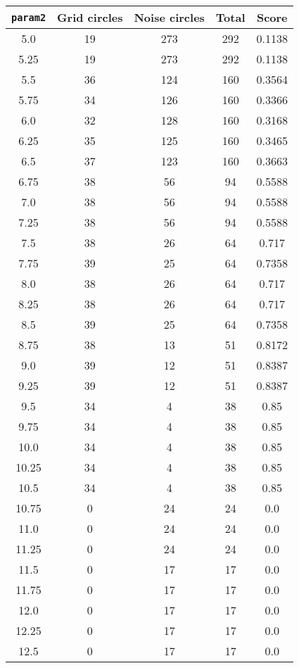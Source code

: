 \documentclass[letterpaper, 12pt]{article}
\begin{document}
\begin{longtable}{|c|c|c|c|c|}
\hline
\textbf{\texttt{param2}} & \textbf{Grid circles} & \textbf{Noise circles} & \textbf{Total} & \textbf{Score} \\
\hline
5.0 & 19 & 273 & 292 & 0.1138 \\
\hline
5.25 & 19 & 273 & 292 & 0.1138 \\
\hline
5.5 & 36 & 124 & 160 & 0.3564 \\
\hline
5.75 & 34 & 126 & 160 & 0.3366 \\
\hline
6.0 & 32 & 128 & 160 & 0.3168 \\
\hline
6.25 & 35 & 125 & 160 & 0.3465 \\
\hline
6.5 & 37 & 123 & 160 & 0.3663 \\
\hline
6.75 & 38 & 56 & 94 & 0.5588 \\
\hline
7.0 & 38 & 56 & 94 & 0.5588 \\
\hline
7.25 & 38 & 56 & 94 & 0.5588 \\
\hline
7.5 & 38 & 26 & 64 & 0.717 \\
\hline
7.75 & 39 & 25 & 64 & 0.7358 \\
\hline
8.0 & 38 & 26 & 64 & 0.717 \\
\hline
8.25 & 38 & 26 & 64 & 0.717 \\
\hline
8.5 & 39 & 25 & 64 & 0.7358 \\
\hline
8.75 & 38 & 13 & 51 & 0.8172 \\
\hline
9.0 & 39 & 12 & 51 & 0.8387 \\
\hline
9.25 & 39 & 12 & 51 & 0.8387 \\
\hline
9.5 & 34 & 4 & 38 & 0.85 \\
\hline
9.75 & 34 & 4 & 38 & 0.85 \\
\hline
10.0 & 34 & 4 & 38 & 0.85 \\
\hline
10.25 & 34 & 4 & 38 & 0.85 \\
\hline
10.5 & 34 & 4 & 38 & 0.85 \\
\hline
10.75 & 0 & 24 & 24 & 0.0 \\
\hline
11.0 & 0 & 24 & 24 & 0.0 \\
\hline
11.25 & 0 & 24 & 24 & 0.0 \\
\hline
11.5 & 0 & 17 & 17 & 0.0 \\
\hline
11.75 & 0 & 17 & 17 & 0.0 \\
\hline
12.0 & 0 & 17 & 17 & 0.0 \\
\hline
12.25 & 0 & 17 & 17 & 0.0 \\
\hline
12.5 & 0 & 17 & 17 & 0.0 \\

\end{longtable}
\end{document}
